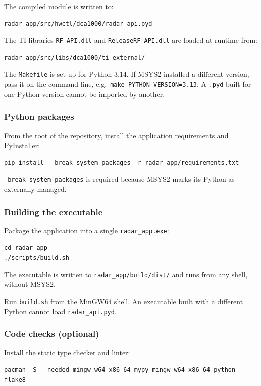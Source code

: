 \documentclass[12pt, a4paper]{article}
\begin{document}
\newpage
\noindent
The compiled module is written to:
\begin{lstlisting}
radar_app/src/hwctl/dca1000/radar_api.pyd
\end{lstlisting}

\noindent
The TI libraries \texttt{RF\_API.dll} and \texttt{ReleaseRF\_API.dll} are loaded at
runtime from:
\begin{lstlisting}
radar_app/src/libs/dca1000/ti-external/
\end{lstlisting}


\begin{important}
The \texttt{Makefile} is set up for Python 3.14. If MSYS2 installed a different version,
pass it on the command line, e.g.\ \texttt{make PYTHON\_VERSION=3.13}.
A \texttt{.pyd} built for one Python version cannot be imported by another.
\end{important}


\subsubsection{Python packages}

From the root of the repository, install the application requirements and PyInstaller:
\begin{lstlisting}
pip install --break-system-packages -r radar_app/requirements.txt
\end{lstlisting}
\texttt{--break-system-packages} is required because MSYS2 marks its Python as
externally managed.


\subsubsection{Building the executable}
Package the application into a single \texttt{radar\_app.exe}:
\begin{lstlisting}
cd radar_app
./scripts/build.sh
\end{lstlisting}

The executable is written to \texttt{radar\_app/build/dist/} and runs from any shell,
without MSYS2.

\begin{important}
Run \texttt{build.sh} from the MinGW64 shell. An executable built with a different Python
cannot load \texttt{radar\_api.pyd}.
\end{important}


\subsubsection{Code checks (optional)}
Install the static type checker and linter:
\begin{lstlisting}
pacman -S --needed mingw-w64-x86_64-mypy mingw-w64-x86_64-python-flake8
\end{lstlisting}
\end{document}
